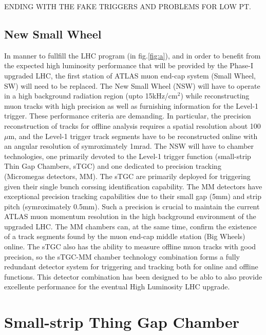 ENDING WITH THE FAKE TRIGGERS AND PROBLEMS FOR LOW PT.\par 



\subsection{New Small Wheel}

In manner to fullfill the LHC program (in fig.\ref{fig:a}), and in order to benefit from the expected high luminosity performance that will be provided by the
Phase-I upgraded LHC, the first station of ATLAS muon end-cap system (Small Wheel, SW) will need to be replaced.  The New Small Wheel (NSW) will have to operate
in a high background radiation region (upto 15kHz/cm$^2$) while reconstructing muon tracks with high precision as well as furnishing information for the Level-1
trigger. These performance criteria are demanding. In particular, the precision reconstruction of tracks for offline analysis requires a spatial resolution
about 100 $\mu$m, and the Level-1 trigger track segments have to be reconstructed online with an angular resolution of symroximately 1mrad. The NSW will have to
chamber technologies, one primarily devoted to the Level-1 trigger function (small-strip Thin Gap Chambers, sTGC) and one dedicated to precision tracking
(Micromegas detectors, MM). The sTGC are primarily deployed for triggering given their single bunch corssing identification capability. The MM detectors have
exceptional precision tracking capabilities due to their small gap (5mm) and strip pitch (symroximately 0.5mm). Such a precision is crucial to maintain the
current ATLAS muon momentum resolution in the high background environment of the upgraded LHC. The MM chambers can, at the same time, confirm the existence of a
track segments found by the muon end-cap middle station (Big Wheels) online. The sTGC also has the ability to measure offline muon tracks with good precision,
so the sTGC-MM chamber technology combination forms a fully redundant detector system for triggering and tracking both for online and offline functions. This
detector combination has been designed to be ablo to also provide excellente performance for the eventual High Luminosity LHC upgrade.\par 



\section{Small-strip Thing Gap Chamber}

